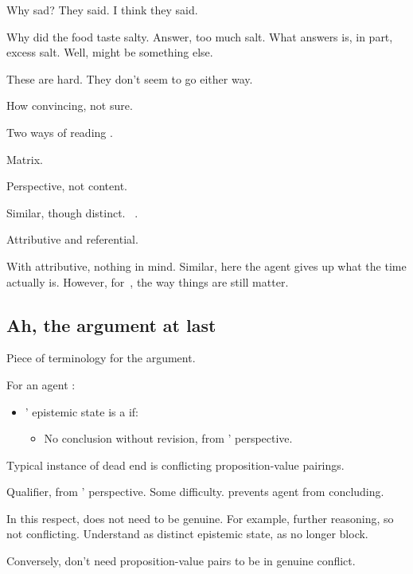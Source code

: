 \begin{note}
  Why sad?
  They said.
  I think they said.

  Why did the food taste salty.
  Answer, too much salt.
  What answers is, in part, excess salt.
  Well, might be something else.

  {
    \color{red}
    These are hard.
    They don't seem to go either way.
  }
\end{note}

\begin{note}
  How convincing, not sure.

  Two ways of reading \citeauthor{Descartes:1996vp}.
\end{note}

\begin{note}
  Matrix.

  Perspective, not content.
\end{note}

\begin{note}
  Similar, though distinct.
  ~\cite{Donnellan:1966wt}.

  Attributive and referential.

  With attributive, nothing in mind.
  Similar, here the agent gives up what the time actually is.
  However, for~\citeauthor{Donnellan:1966wt}, the way things are still matter.
\end{note}


\subsection{Ah, the argument at last}
\label{sec:ah-argument-at}

\begin{note}[A \deadEnd{}]
  Piece of terminology for the argument.

  \begin{definition}[A \deadEnd{0}]
    \label{def:dead-end}
    For an agent \vAgent{}:

    \begin{itemize}
    \item
      \vAgent{}' epistemic state is a \emph{} if:
      \begin{itemize}
      \item
        No conclusion without revision, from \vAgent{}' perspective.
      \end{itemize}
    \end{itemize}
    \vspace{-\baselineskip}
  \end{definition}

  Typical instance of dead end is conflicting proposition-value pairings.

  Qualifier, from \vAgent{}' perspective.
  Some difficulty.
  \deadEnd{} prevents agent from concluding.

  In this respect, \deadEnd{} does not need to be genuine.
  For example, further reasoning, so not conflicting.
  Understand as distinct epistemic state, as no longer block.

  Conversely, don't need proposition-value pairs to be in genuine conflict.
\end{note}


